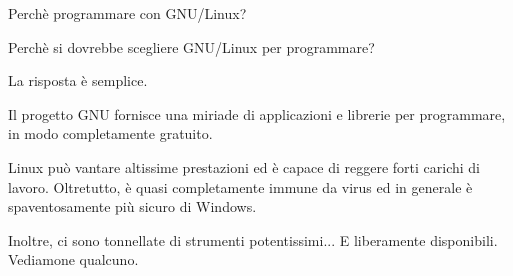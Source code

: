 \begin{slide}{Perchè programmare con GNU/Linux?}
{\small
Perchè si dovrebbe scegliere GNU/Linux per programmare?

La risposta è semplice. 

Il progetto GNU fornisce una miriade di
applicazioni e librerie per programmare, in modo completamente gratuito.

Linux può vantare altissime prestazioni ed è capace di reggere forti
carichi di lavoro. Oltretutto, è quasi completamente immune da virus ed
in generale è spaventosamente più sicuro di Windows.

Inoltre, ci sono tonnellate di strumenti potentissimi... E liberamente
disponibili. Vediamone qualcuno.
}
\end{slide}
